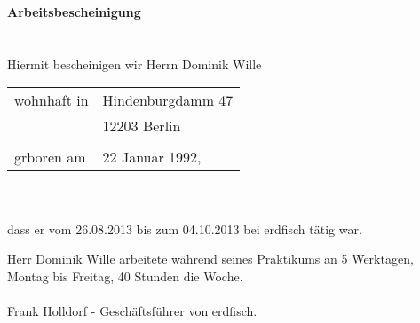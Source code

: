 \documentclass{letter}
\begin{document}
  \textbf{Arbeitsbescheinigung} \\
  \\
  \\ Hiermit bescheinigen wir Herrn Dominik Wille

  \begin{tabular}{l l}
    wohnhaft in & Hindenburgdamm 47 \\
    & 12203 Berlin \\
    & \\
    grboren am & 22 Januar 1992,
  \end{tabular} \\
  \\
  dass er vom 26.08.2013 bis zum 04.10.2013 bei erdfisch tätig war.

  Herr Dominik Wille arbeitete während seines Praktikums an 5 Werktagen, Montag bis Freitag,
  40 Stunden die Woche. \\
  \\
  Frank Holldorf - Geschäftsführer von erdfisch.
\end{document}
